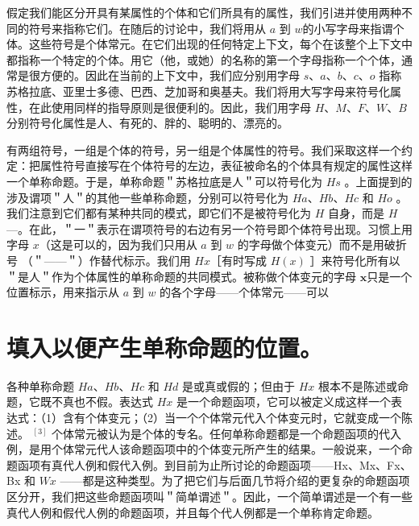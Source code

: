 假定我们能区分开具有某属性的个体和它们所具有的属性，我们引进并使用两种不同的符号来指称它们。在随后的讨论中，我们将用从 $a$ 到 $w$的小写字母来指谓个体。这些符号是个体常元。在它们出现的任何特定上下文，每个在该整个上下文中都指称一个特定的个体。用它（他，或她）的名称的第一个字母指称一个个体，通常是很方便的。因此在当前的上下文中，我们应分别用字母 $s 、 a 、 b 、 c 、 o$ 指称苏格拉底、亚里士多德、巴西、芝加哥和奥基夫。我们将用大写字母来符号化属性，在此使用同样的指导原则是很便利的。因此，我们用字母 $H 、 M 、 F 、 W 、 B$ 分别符号化属性是人、有死的、胖的、聪明的、漂亮的。

有两组符号，一组是个体的符号，另一组是个体属性的符号。我们采取这样一个约定：把属性符号直接写在个体符号的左边，表征被命名的个体具有规定的属性这样一个单称命题。于是，单称命题＂苏格拉底是人＂可以符号化为 $H s$ 。上面提到的涉及谓项＂人＂的其他一些单称命题，分别可以符号化为 $H a 、 H b 、 H c$ 和 $H o$ 。我们注意到它们都有某种共同的模式，即它们不是被符号化为 $H$ 自身，而是 $H$ —。在此，＂一＂表示在谓项符号的右边有另一个符号即个体符号出现。习惯上用字母 $x$（这是可以的，因为我们只用从 $a$ 到 $w$ 的字母做个体变元）而不是用破折号 （＂——＂）作替代标示。我们用 $H x$［有时写成 $H(x)$ ］来符号化所有以 ＂是人＂作为个体属性的单称命题的共同模式。被称做个体变元的字母 $\boldsymbol{x}$只是一个位置标示，用来指示从 $a$ 到 $w$ 的各个字母——个体常元——可以

\section*{填入以便产生单称命题的位置。}
各种单称命题 $H a 、 H b 、 H c$ 和 $H d$ 是或真或假的；但由于 $H x$ 根本不是陈述或命题，它既不真也不假。表达式 $H x$ 是一个命题函项，它可以被定义成这样一个表达式：（1）含有个体变元；（2）当一个个体常元代入个体变元时，它就变成一个陈述。 ${ }^{[3]}$ 个体常元被认为是个体的专名。任何单称命题都是一个命题函项的代入例，是用个体常元代人该命题函项中的个体变元所产生的结果。一般说来，一个命题函项有真代人例和假代入例。到目前为止所讨论的命题函项——Hx、Mx、Fx、Bx 和 $W x$ ——都是这种类型。为了把它们与后面几节将介绍的更复杂的命题函项区分开，我们把这些命题函项叫＂简单谓述＂。因此，一个简单谓述是一个有一些真代人例和假代人例的命题函项，并且每个代人例都是一个单称肯定命题。 